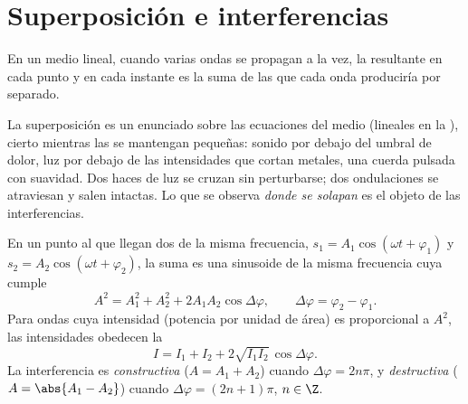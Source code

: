 \section{Superposición e interferencias}

\begin{theorem}[Superposición]\label{thm:b1:wave-propagation:superposition}
En un medio lineal, cuando varias ondas se propagan a la vez, la 
resultante en cada punto y en cada instante es la suma de las  que
cada onda produciría por separado.
\end{theorem}
\admitted

\begin{remark}[Linealidad]\label{rem:b1:wave-propagation:linearity}
La superposición es un enunciado sobre las ecuaciones del medio (lineales
en la ), cierto mientras las  se mantengan pequeñas: sonido
por debajo del umbral de dolor, luz por debajo de las intensidades que
cortan metales, una cuerda pulsada con suavidad. Dos haces de luz se
cruzan sin perturbarse; dos ondulaciones se atraviesan y salen intactas.
Lo que se observa \emph{donde se solapan} es el objeto de las interferencias.
\end{remark}

\begin{theorem}\label{thm:b1:wave-propagation:fresnel}
En un punto al que llegan dos  de la misma frecuencia,
$s_1 = A_1\cos(\omega t + \varphi_1)$ y $s_2 = A_2\cos(\omega t + \varphi_2)$,
la suma es una sinusoide de la misma frecuencia cuya  cumple
\[
A^2 = A_1^2 + A_2^2 + 2A_1A_2\cos\Delta\varphi,
\qquad \Delta\varphi = \varphi_2 - \varphi_1 .
\]
Para ondas cuya intensidad (potencia por unidad de área) es proporcional a
$A^2$, las intensidades obedecen la \emph{}
\[
I = I_1 + I_2 + 2\sqrt{I_1 I_2}\,\cos\Delta\varphi .
\]
La interferencia es \emph{constructiva} ($A = A_1 + A_2$) cuando
$\Delta\varphi = 2n\pi$, y \emph{destructiva} ($A = \abs{A_1 - A_2}$)
cuando $\Delta\varphi = (2n + 1)\pi$, $n \in \Z$.
\end{theorem}

